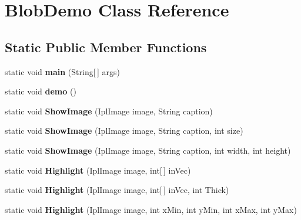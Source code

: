 \hypertarget{class_blob_demo}{}\section{Blob\+Demo Class Reference}
\label{class_blob_demo}
\subsection*{Static Public Member Functions}
\begin{DoxyCompactItemize}
\item 
\hypertarget{class_blob_demo_a5d8782b46610b04744fd610fef3f2c5c}{}static void {\bfseries main} (String\mbox{[}$\,$\mbox{]} args)\label{class_blob_demo_a5d8782b46610b04744fd610fef3f2c5c}

\item 
\hypertarget{class_blob_demo_a739a220039d01d79b6ec670792fec5d2}{}static void {\bfseries demo} ()\label{class_blob_demo_a739a220039d01d79b6ec670792fec5d2}

\item 
\hypertarget{class_blob_demo_a039f73073e81b588451300d08892712d}{}static void {\bfseries Show\+Image} (Ipl\+Image image, String caption)\label{class_blob_demo_a039f73073e81b588451300d08892712d}

\item 
\hypertarget{class_blob_demo_a5ac6d0f9ba5a521d90533b513dd43421}{}static void {\bfseries Show\+Image} (Ipl\+Image image, String caption, int size)\label{class_blob_demo_a5ac6d0f9ba5a521d90533b513dd43421}

\item 
\hypertarget{class_blob_demo_a5e5334cb3a3d9525f97e7536f4c9b45b}{}static void {\bfseries Show\+Image} (Ipl\+Image image, String caption, int width, int height)\label{class_blob_demo_a5e5334cb3a3d9525f97e7536f4c9b45b}

\item 
\hypertarget{class_blob_demo_a1f15f3dc8269bef41f73e953904660fe}{}static void {\bfseries Highlight} (Ipl\+Image image, int\mbox{[}$\,$\mbox{]} in\+Vec)\label{class_blob_demo_a1f15f3dc8269bef41f73e953904660fe}

\item 
\hypertarget{class_blob_demo_ac2294643d2e7d79bbb3e783c06cff800}{}static void {\bfseries Highlight} (Ipl\+Image image, int\mbox{[}$\,$\mbox{]} in\+Vec, int Thick)\label{class_blob_demo_ac2294643d2e7d79bbb3e783c06cff800}

\item 
\hypertarget{class_blob_demo_af171e1d65166293281157898182f2786}{}static void {\bfseries Highlight} (Ipl\+Image image, int x\+Min, int y\+Min, int x\+Max, int y\+Max)\label{class_blob_demo_af171e1d65166293281157898182f2786}


\end{DoxyCompactItemize}
